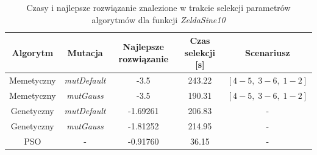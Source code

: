 \begin{table}[ht]
\caption{Czasy i najlepsze rozwiązanie znalezione w trakcie selekcji parametrów algorytmów dla funkcji \emph{ZeldaSine10}}
\label{table:selekcja_Zeldasine_czasy}
\begin{center}
\begin{tabular}{|c|c|c|c|c|}
	\hline
	Algorytm & Mutacja & Najlepsze rozwiązanie & Czas selekcji [s] & Scenariusz \\
	\hline
	Memetyczny & \emph{mutDefault} & -3.5 & 243.22 & $[4-5,\;3-6,\;1-2]$\\
	Memetyczny & \emph{mutGauss} & -3.5 & 190.31 & $[4-5,\;3-6,\;1-2]$ \\
	Genetyczny & \emph{mutDefault} & -1.69261 & 206.83 & - \\
	Genetyczny & \emph{mutGauss} & -1.81252 & 214.95 & - \\
	PSO	& - & -0.91760 & 36.15 & -\\

	\hline
	\end{tabular}
\end{center}
\end{table}

